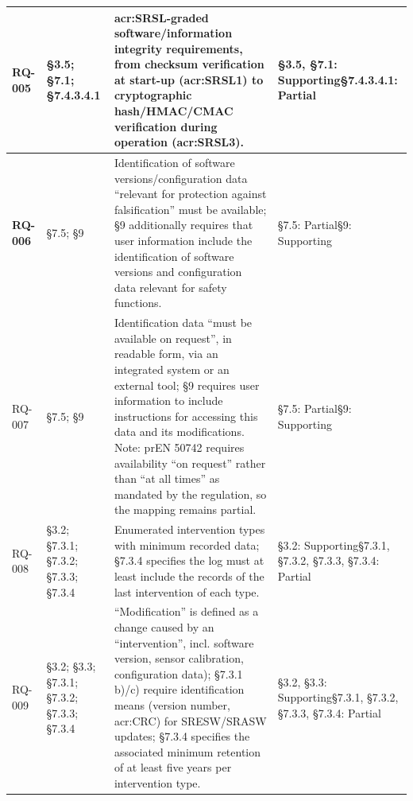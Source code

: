 \begin{longtable}{|>{\bfseries}p{1cm}|p{2.5cm}|p{9cm}|>{\centering\arraybackslash}p{2cm}|}
	RQ-005 &
	\S3.5;  \newline \S7.1;  \newline\S7.4.3.4.1 &
	\gls{acr:SRSL}-graded software/information integrity requirements, from checksum verification at start-up (\gls{acr:SRSL}1) to cryptographic hash/HMAC/CMAC verification during operation (\gls{acr:SRSL}3). &
	\S3.5, \S7.1: Supporting\newline\S7.4.3.4.1: Partial \\
	\hline
	
	
	RQ-006 &
	\S7.5;  \newline\S9 &
	Identification of software versions/configuration data ``relevant for protection against falsification'' must be available; \S9 additionally requires that user information include the identification of software versions and configuration data relevant for safety functions. &
	\S7.5: Partial\newline\S9: Supporting \\
	\hline
	
	RQ-007 &
	\S7.5; \newline \S9 &
	Identification data ``must be available on request'', in readable form, via an integrated system or an external tool; \S9 requires user information to include instructions for accessing this data and its modifications. Note: prEN 50742 requires availability ``on request'' rather than ``at all times'' as mandated by the regulation, so the mapping remains partial. &
	\S7.5: Partial\newline\S9: Supporting \\
	\hline
	
	RQ-008 &
	\S3.2;  \newline \S7.3.1;  \newline \S7.3.2;  \newline \S7.3.3;  \newline\S7.3.4 &
	Enumerated intervention types with minimum recorded data; \S7.3.4 specifies the log must at least include the records of the last intervention of each type. &
	\S3.2: Supporting\newline\S7.3.1, \S7.3.2, \S7.3.3, \S7.3.4: Partial\\
	\hline
	
	RQ-009 &
	\S3.2; \newline \S3.3;  \newline \S7.3.1;  \newline \S7.3.2;   \newline\S7.3.3; \newline \S7.3.4 &
	``Modification'' is defined as a change caused by an ``intervention'', incl. software version, sensor calibration, configuration data); \S7.3.1 b)/c) require identification means (version number, \gls{acr:CRC}) for SRESW/SRASW updates; \S7.3.4 specifies the associated minimum retention of at least five years per intervention type. &
	\S3.2, \S3.3: Supporting\newline\S7.3.1, \S7.3.2, \S7.3.3, \S7.3.4: Partial \\
	\hline
	

\end{longtable}
